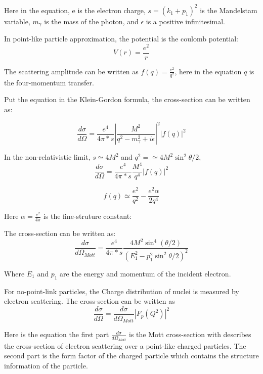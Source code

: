 Here in the equation,  e is the electron charge, $s = (k_1 + p_1)^2$ is the Mandelstam variable, $m_\gamma$ is the mass of the photon, and $\epsilon$ is a positive infinitesimal. 

In point-like particle approximation, the potential is the coulomb potential: 
\begin{equation}
    V(r) = \frac{e^2}{r}
\end{equation}

The scattering amplitude can be written as $f(q) = \frac{e^2}{q^2}$, here in the equation $q$ is the four-momentum transfer.

Put the equation in the Klein-Gordon formula, the cross-section can be written as:

\begin{equation}
     \frac{d\sigma}{d\Omega} = \frac{e^4}{4\pi*s}|\frac{M^2}{q^2 - m^2_\gamma + i\epsilon}|^2|f(q)|^2
\end{equation}

In the non-relativistic limit, $s \simeq 4M^2$ and $q^2 = \simeq 4M^2 \sin^2{\theta/2}$, 
\begin{equation}
    \frac{d\sigma}{d\Omega} = \frac{e^4}{4\pi*s} \frac{M^4}{q^4}|f(q)|^2
\end{equation}

\begin{equation}
    f(q) \simeq \frac{e^2}{q^2} - \frac{e^2\alpha}{2q^4}
\end{equation}

Here $\alpha = \frac{e^2}{4\pi}$ is the fine-struture constant:

The cross-section can be written as:
\begin{equation}
      \frac{d\sigma}{d\Omega_{Mott}} =   \frac{e^4}{4\pi*s} \frac{4M^2\sin^4{(\theta/2)}}{(E_1^2 - p_1^2\sin^2{\theta/2})^2}
\end{equation}

Where $E_1$ and $p_1$ are the energy and momentum of the incident electron. 


For no-point-link particles, the Charge distribution of nuclei is measured by electron scattering. The cross-section can be written as
\begin{equation}
    \frac{d\sigma}{d\Omega} = \frac{d\sigma}{d\Omega_{Mott}}|F_p(Q^2)|^2
\end{equation}

Here is the equation the first part $\frac{d\sigma}{d\Omega_{Mott}}$ is the Mott cross-section with describes the cross-section of electron scattering over a point-like charged particles. The second part is the form factor of the charged particle which contains the structure information of the particle. 


